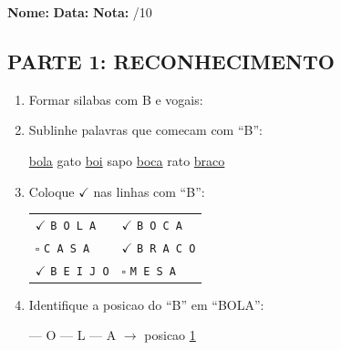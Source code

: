 

\begin{exercicio}
\noindent\textbf{Nome:} \underline{\hspace{3.2cm}} \quad \textbf{Data:} \underline{\hspace{1.6cm}} \quad \textbf{Nota:} \underline{\hspace{0.9cm}}/10

\subsection*{PARTE 1: RECONHECIMENTO}

\begin{enumerate}
  \item Formar silabas com B e vogais:
  \begin{center}
   \quad {} \quad {} \quad {} \quad {}
  \end{center}

  \item Sublinhe palavras que comecam com ``B'':
  \begin{center}
  \uline{bola} \quad gato \quad \uline{boi} \quad sapo \quad \uline{boca} \quad rato \quad \uline{braco}
  \end{center}

  \item Coloque $\checkmark$ nas linhas com ``B'':
  \begin{center}
  \begin{tabular}{ll}
  $\checkmark$ \texttt{B O L A} & $\checkmark$ \texttt{B O C A} \\
  $\square$ \texttt{C A S A} & $\checkmark$ \texttt{B R A C O} \\
  $\checkmark$ \texttt{B E I J O} & $\square$ \texttt{M E S A}
  \end{tabular}
  \end{center}

  \item Identifique a posicao do ``B'' em ``BOLA'':
  \begin{center}
   --- O --- L --- A $\rightarrow$ posicao \underline{1}
  \end{center}


\end{enumerate}
\end{exercicio}
